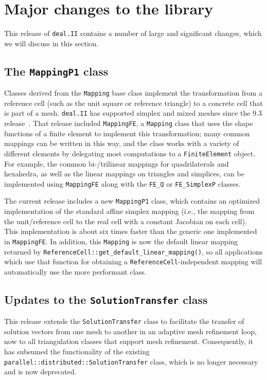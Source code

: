 \documentclass{ansarticle-preprint}
\newcommand{\specialword}[1]{\texttt{#1}}
\newcommand{\dealii}{{\specialword{deal.II}}\xspace}
\begin{document}
\section{Major changes to the library}
\label{sec:major}

This release of \dealii contains a number of large and significant changes,
which we will discuss in this section.


\subsection{The \texttt{MappingP1} class}
\label{subsec:mappingp1}

Classes derived from the \texttt{Mapping} base class implement
the transformation from a reference cell (such as the unit
square or reference triangle) to a concrete cell that is part of a mesh.
\dealii has supported simplex and mixed meshes since the 9.3
release~\cite{dealii93}. That release included \texttt{MappingFE}, a
\texttt{Mapping} class that uses the shape functions of a finite
element to implement this transformation; many common mappings can be
written in this way, and the class works with a variety of different elements by
delegating most computations to a \texttt{FiniteElement}
object. For example, the common bi-/trilinear mappings for quadrilaterals and
hexahedra, as well as the linear mappings on triangles and simplices,
can be implemented using \texttt{MappingFE} along with the
\texttt{FE\_Q} or \texttt{FE\_SimplexP} classes.

The current
release includes a new \texttt{MappingP1} class, which contains an optimized
implementation of the standard affine simplex mapping (i.e., the mapping from
the unit/reference cell to the real cell with a constant Jacobian on each cell). This
implementation is about six times faster than the generic one implemented in
\texttt{MappingFE}. In addition, this \texttt{Mapping} is now the default linear
mapping returned by \texttt{ReferenceCell::get\_default\_linear\_mapping()}, so
all applications which use that function for obtaining a
\texttt{ReferenceCell}-independent mapping will automatically use the more
performant class.

\subsection{Updates to the \texttt{SolutionTransfer} class}
\label{subsec:solutiontransfer}
This release extends the \texttt{SolutionTransfer} class to facilitate
the transfer of solution vectors from one mesh to another in an
adaptive mesh refinement loop, now to
all triangulation classes that support mesh refinement.
Consequently, it has subsumed the functionality of the existing
\texttt{parallel::distributed::SolutionTransfer} class, which is no
longer necessary and is now deprecated.
\end{document}
